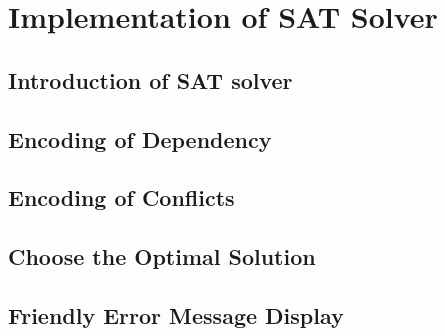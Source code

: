 \section{Implementation of SAT Solver}

\subsection{Introduction of SAT solver}

\subsection{Encoding of Dependency}

\subsection{Encoding of Conflicts}

\subsection{Choose the Optimal Solution}

\subsection{Friendly Error Message Display}
